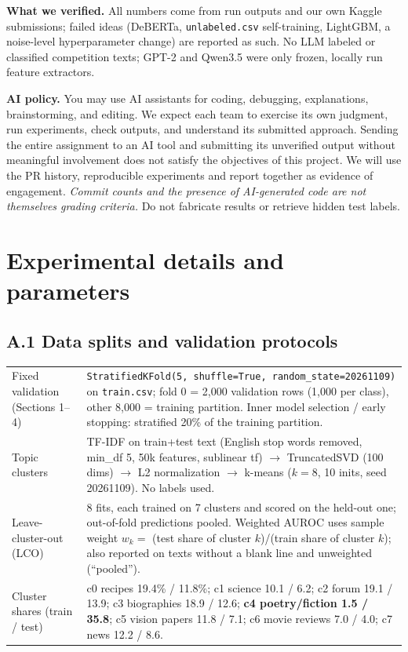 \documentclass[11pt,letterpaper]{article}
\begin{document}
\textbf{What we verified.} All numbers come from run outputs and our own Kaggle submissions; failed ideas (DeBERTa, \texttt{unlabeled.csv} self-training, LightGBM, a noise-level hyperparameter change) are reported as such. No LLM labeled or classified competition texts; GPT-2 and Qwen3.5 were only frozen, locally run feature extractors.

\textbf{AI policy.} You may use AI assistants for coding, debugging, explanations, brainstorming, and editing. We expect each team to exercise its own judgment, run experiments, check outputs, and understand its submitted approach. Sending the entire assignment to an AI tool and submitting its unverified output without meaningful involvement does not satisfy the objectives of this project. We will use the PR history, reproducible experiments and report together as evidence of engagement. \emph{Commit counts and the presence of AI-generated code are not themselves grading criteria.} Do not fabricate results or retrieve hidden test labels.


\newpage
\appendix
\renewcommand{\thesection}{\Alph{section}}
\section{Experimental details and parameters}
\small
\subsection*{A.1 Data splits and validation protocols}
\begin{tabularx}{\linewidth}{@{}p{1.55in}Y@{}}\toprule
Fixed validation (Sections 1--4) & \texttt{StratifiedKFold(5, shuffle=True, random\_state=20261109)} on \texttt{train.csv}; fold 0 = 2,000 validation rows (1,000 per class), other 8,000 = training partition. Inner model selection / early stopping: stratified 20\% of the training partition. \\
Topic clusters & TF-IDF on train+test text (English stop words removed, min\_df 5, 50k features, sublinear tf) $\to$ TruncatedSVD (100 dims) $\to$ L2 normalization $\to$ k-means ($k=8$, 10 inits, seed 20261109). No labels used. \\
Leave-cluster-out (LCO) & 8 fits, each trained on 7 clusters and scored on the held-out one; out-of-fold predictions pooled. Weighted AUROC uses sample weight $w_k=$ (test share of cluster $k$)/(train share of cluster $k$); also reported on texts without a blank line and unweighted (``pooled''). \\
Cluster shares (train / test) & c0 recipes 19.4\% / 11.8\%; c1 science 10.1 / 6.2; c2 forum 19.1 / 13.9; c3 biographies 18.9 / 12.6; \textbf{c4 poetry/fiction 1.5 / 35.8}; c5 vision papers 11.8 / 7.1; c6 movie reviews 7.0 / 4.0; c7 news 12.2 / 8.6. \\
\bottomrule\end{tabularx}
\end{document}
